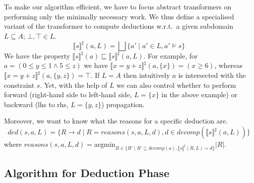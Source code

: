 To make our algorithm efficient, we have to focus abstract
transformers on performing only the minimally necessary
work. 
%
We thus define a specialised variant of the transformer to compute
deductions w.r.t.\ a given subdomain $L\subseteq A$; $\bot,\top \in L$.
\[\llbracket s \rrbracket^\sharp(a,L)=\bigsqcup \{a'\mid a'\in L, a'\models s\}\]
We have the property $\llbracket s \rrbracket^\sharp(a)\sqsubseteq \llbracket s \rrbracket^\sharp(a,L)$.
%
For example, for
$a=(0\leq y \leq 1 \wedge 5\leq z)$ we have
$\llbracket x=y+z\rrbracket^\sharp(a,\{x\})=(x\geq 6)$, whereas
$\llbracket x=y+z\rrbracket^\sharp(a,\{y,z\})=\top$.
%
If $L=A$ then intuitively $a$ is intersected with the constraint $s$.
Yet, with the help of $L$ we can also control whether to perform
forward (right-hand side to left-hand side, $L=\{x\}$ in the above
example) or backward (lhs to rhs, $L=\{y,z\}$) propagation.

Moreover, we want to know what the reasons for a specific deduction are.
\[ded(s,a,L)=\{R\rightarrow d\mid R=reasons(s,a,L,d), d \in decomp(\llbracket s \rrbracket^\sharp(a,L))\}\]
where 
$reasons(s,a,L,d)=\text{argmin}_{R\in\{R'\mid R'\subseteq decomp(a), \llbracket s\rrbracket^\sharp(R,L)=d\}} |R| $.




\subsection{Algorithm for Deduction Phase}
%

